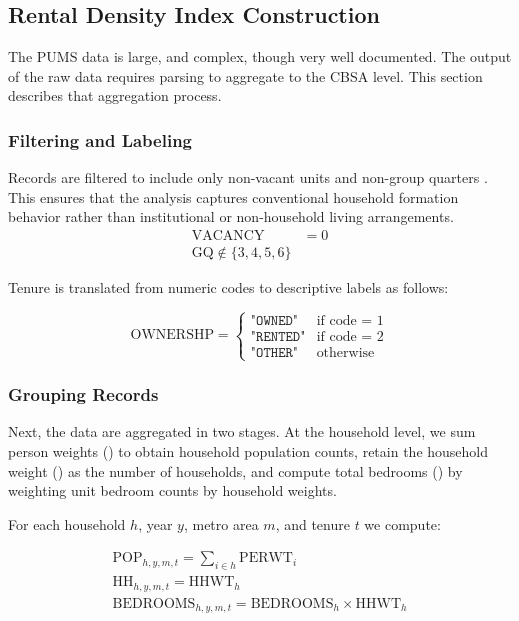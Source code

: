 \documentclass[pdflatex,sn-basic]{sn-jnl}%
\theoremstyle{thmstyleone}%
\theoremstyle{thmstyletwo}%
\theoremstyle{thmstylethree}%
\begin{document}
\subsection{Rental Density Index Construction}
The PUMS data is large, and complex, though very well documented. The output of the raw data requires parsing to aggregate to the CBSA level. This section describes that aggregation process.
\subsubsection{Filtering and Labeling}
Records are filtered to include only non-vacant units and non-group quarters . This ensures that the analysis captures conventional household formation behavior rather than institutional or non-household living arrangements.
\begin{align}
	\text{VACANCY} &= 0 \\
	\text{GQ} \notin \{3,4,5,6\}
\end{align}

Tenure is translated from numeric codes to descriptive labels as follows:

\begin{equation}
	\text{OWNERSHP} =
	\begin{cases}
		\texttt{"OWNED"} & \text{if code = 1} \\
		\texttt{"RENTED"} & \text{if code = 2} \\
		\texttt{"OTHER"} & \text{otherwise}
	\end{cases}
\end{equation}

\subsubsection{Grouping Records}
Next, the data are aggregated in two stages. At the household level, we sum person weights () to obtain household population counts, retain the household weight () as the number of households, and compute total bedrooms () by weighting unit bedroom counts by household weights. 

For each household \( h \), year \( y \), metro area \( m\), and tenure \(t\) we compute:

\begin{align}
	\text{POP}_{h,y,m,t} = \sum_{i \in h} \text{PERWT}_{i} \\
	\text{HH}_{h,y,m,t} = \text{HHWT}_{h} \\
	\text{BEDROOMS}_{h,y,m,t} = \text{BEDROOMS}_{h} \times \text{HHWT}_{h} 
\end{align}
\end{document}
